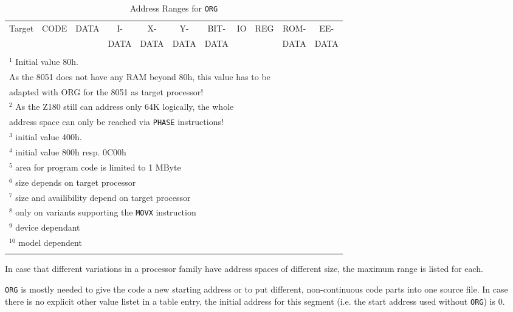\documentclass[12pt,twoside]{report}
\newcommand{\tty}[1]{{\tt #1}}
\newcommand{\tin}[1]{{\scriptsize #1}}
\begin{document}
\hfuzz=60pt
\small
\begin{longtable}{|l|c|c|c|c|c|c|c|c|c|c|}
\hline
\tin{Target} & \tin{CODE} & \tin{DATA} & \tin{I-}   & \tin{X-}   & \tin{Y-}   & \tin{BIT-} & \tin{IO} & \tin{REG} & \tin{ROM-}  & \tin{EE-}  \\
             &            &            & \tin{DATA} & \tin{DATA} & \tin{DATA} & \tin{DATA} &          &           & \tin{DATA}  & \tin{DATA} \\
\hline
\hline
\endhead

\\ \hline
\multicolumn{11}{|l|}{$^{1}$ Initial value 80h.} \\
\multicolumn{11}{|l|}{   As the 8051 does not have any RAM beyond 80h, this value has to be} \\
\multicolumn{11}{|l|}{   adapted with ORG for the 8051 as target processor!}\\
\hline
\multicolumn{11}{|l|}{$^{2}$ As the Z180 still can address only 64K logically, the whole}\\
\multicolumn{11}{|l|}{   address space can only be reached via \tty{PHASE} instructions!}\\
\hline
\multicolumn{11}{|l|}{$^{3}$ initial value 400h.}\\
\hline
\multicolumn{11}{|l|}{$^{4}$ initial value 800h resp. 0C00h} \\
\hline
\multicolumn{11}{|l|}{$^{5}$ area for program code is limited to 1 MByte} \\
\hline
\multicolumn{11}{|l|}{$^{6}$ size depends on target processor} \\
\hline
\multicolumn{11}{|l|}{$^{7}$ size and availibility depend on target processor} \\
\hline
\multicolumn{11}{|l|}{$^{8}$ only on variants supporting the \tty{MOVX} instruction} \\
\hline
\multicolumn{11}{|l|}{$^{9}$ device dependant} \\
\hline
\multicolumn{11}{|l|}{$^{10}$ model dependent} \\
\hline
\caption{Address Ranges for \tty{ORG}}
\label{TabORG}
\end{longtable}
\normalsize
\hfuzz=0pt

In case that different variations in a processor family have address
spaces of different size, the maximum range is listed for each.

\tty{ORG} is mostly needed to give the code a new starting address or to
put different, non-continuous code parts into one source file.  In case
there is no explicit other value listet in a table entry, the initial
address for this segment (i.e. the start address used without {\tt ORG})
is 0.
\end{document}
